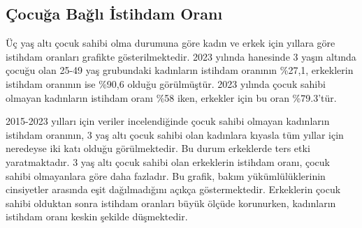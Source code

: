 \documentclass[
  11pt,
  a4paper,
  DIV=11,
  numbers=noendperiod]{scrartcl}
\begin{document}
\subsection{Çocuğa Bağlı İstihdam
Oranı}\label{uxe7ocuux11fa-baux11flux131-istihdam-oranux131}

Üç yaş altı çocuk sahibi olma durumuna göre kadın ve erkek için yıllara
göre istihdam oranları grafikte gösterilmektedir. 2023 yılında hanesinde
3 yaşın altında çocuğu olan 25-49 yaş grubundaki kadınların istihdam
oranının \%27,1, erkeklerin istihdam oranının ise \%90,6 olduğu
görülmüştür. 2023 yılında çocuk sahibi olmayan kadınların istihdam oranı
\%58 iken, erkekler için bu oran \%79.3'tür.

2015-2023 yılları için veriler incelendiğinde çocuk sahibi olmayan
kadınların istihdam oranının, 3 yaş altı çocuk sahibi olan kadınlara
kıyasla tüm yıllar için neredeyse iki katı olduğu görülmektedir. Bu
durum erkeklerde ters etki yaratmaktadır. 3 yaş altı çocuk sahibi olan
erkeklerin istihdam oranı, çocuk sahibi olmayanlara göre daha fazladır.
Bu grafik, bakım yükümlülüklerinin cinsiyetler arasında eşit
dağılmadığını açıkça göstermektedir. Erkeklerin çocuk sahibi olduktan
sonra istihdam oranları büyük ölçüde korunurken, kadınların istihdam
oranı keskin şekilde düşmektedir.
\end{document}
